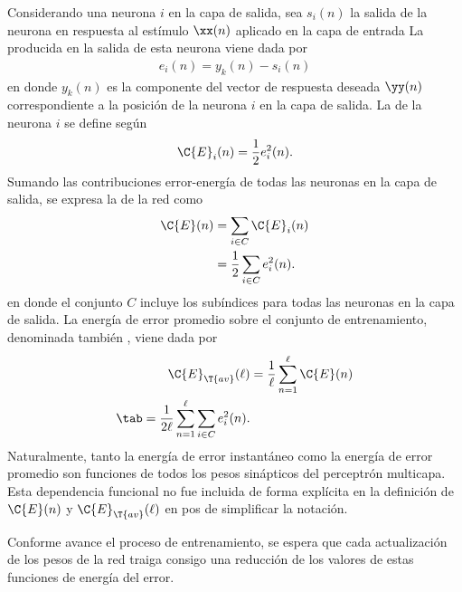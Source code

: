 Considerando una neurona $i$ en la capa de salida, sea $s_i(n)$ la
salida de la neurona en respuesta al estímulo $\xx(n)$ aplicado en la
capa de entrada
La
 producida en la salida de esta neurona viene dada
por
%
\begin{align}\label{e2:error-signal-neuron} %
  e_i(n)=y_{k}(n)-s_{i}(n)
\end{align}
%
en donde $y_k(n)$ es la componente del vector de respuesta deseada
$\yy(n)$ correspondiente a la posición de la neurona $i$ en la capa de
salida.
La  de la neurona $i$ se define según
%
\begin{align}\label{e2:error-energy-neuron} %
  \C{E}_i(n)=\frac{1}{2}e^2_i(n).
\end{align}
%
Sumando las contribuciones error-energía de todas las neuronas en la
capa de salida, se expresa la 
de la red como
%
\begin{align}\label{e2:error-energy-net} %
  \C{E}(n)&=\sum_{i\in C}\C{E}_i(n) \\
  &=\frac{1}{2}\sum_{i\in C}e^2_i(n).
\end{align}
%
en donde el conjunto $C$ incluye los subíndices para todas las
neuronas en la capa de salida. La energía de error promedio sobre el
conjunto de entrenamiento, denominada también ,
viene dada por
%
\begin{align}\label{e2:average-energy-net} %
  \C{E}_{\T{av}}(\ell)&=\frac{1}{\ell}\sum_{n=1}^\ell\C{E}(n) \\
  \tab=\frac{1}{2\ell} \sum_{n=1}^\ell \sum_{i\in C}e^2_i(n).
\end{align}
%
Naturalmente, tanto la energía de error instantáneo como la energía de
error promedio son funciones de todos los pesos sinápticos del
perceptrón multicapa. Esta dependencia funcional no fue incluida de
forma explícita en la definición de $\C{E}(n)$ y
$\C{E}_{\T{av}}(\ell)$ en pos de simplificar la notación.

Conforme avance el proceso de entrenamiento, se espera que cada
actualización de los pesos de la red traiga consigo una reducción de
los valores de estas funciones de energía del error.
%
